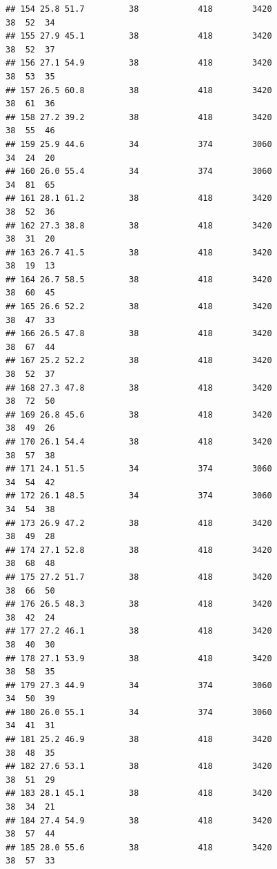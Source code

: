 \documentclass[
]{book}
\theoremstyle{definition}
\theoremstyle{definition}
\theoremstyle{definition}
\theoremstyle{definition}
\theoremstyle{remark}
\begin{document}
\begin{verbatim}
## 154 25.8 51.7         38            418        3420                  38  52  34
## 155 27.9 45.1         38            418        3420                  38  52  37
## 156 27.1 54.9         38            418        3420                  38  53  35
## 157 26.5 60.8         38            418        3420                  38  61  36
## 158 27.2 39.2         38            418        3420                  38  55  46
## 159 25.9 44.6         34            374        3060                  34  24  20
## 160 26.0 55.4         34            374        3060                  34  81  65
## 161 28.1 61.2         38            418        3420                  38  52  36
## 162 27.3 38.8         38            418        3420                  38  31  20
## 163 26.7 41.5         38            418        3420                  38  19  13
## 164 26.7 58.5         38            418        3420                  38  60  45
## 165 26.6 52.2         38            418        3420                  38  47  33
## 166 26.5 47.8         38            418        3420                  38  67  44
## 167 25.2 52.2         38            418        3420                  38  52  37
## 168 27.3 47.8         38            418        3420                  38  72  50
## 169 26.8 45.6         38            418        3420                  38  49  26
## 170 26.1 54.4         38            418        3420                  38  57  38
## 171 24.1 51.5         34            374        3060                  34  54  42
## 172 26.1 48.5         34            374        3060                  34  54  38
## 173 26.9 47.2         38            418        3420                  38  49  28
## 174 27.1 52.8         38            418        3420                  38  68  48
## 175 27.2 51.7         38            418        3420                  38  66  50
## 176 26.5 48.3         38            418        3420                  38  42  24
## 177 27.2 46.1         38            418        3420                  38  40  30
## 178 27.1 53.9         38            418        3420                  38  58  35
## 179 27.3 44.9         34            374        3060                  34  50  39
## 180 26.0 55.1         34            374        3060                  34  41  31
## 181 25.2 46.9         38            418        3420                  38  48  35
## 182 27.6 53.1         38            418        3420                  38  51  29
## 183 28.1 45.1         38            418        3420                  38  34  21
## 184 27.4 54.9         38            418        3420                  38  57  44
## 185 28.0 55.6         38            418        3420                  38  57  33

\end{verbatim}
\end{document}
